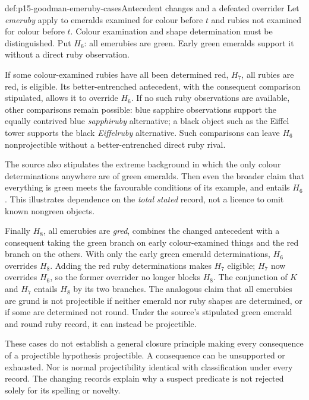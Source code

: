 \begin{hbexample}{def:p15-goodman-emeruby-cases}{Antecedent changes and a defeated overrider}
Let \emph{emeruby} apply to emeralds examined for colour before $t$ and
rubies not examined for colour before $t$. Colour examination and shape
determination must be distinguished. Put $H_6$: all emerubies are green.
Early green emeralds support it without a direct ruby observation.

If some colour-examined rubies have all been determined red, $H_7$, all
rubies are red, is eligible. Its better-entrenched antecedent, with the
consequent comparison stipulated, allows it to override $H_6$. If no
such ruby observations are available, other comparisons remain possible:
blue sapphire observations support the equally contrived blue
\emph{sapphiruby} alternative; a black object such as the Eiffel tower
supports the black \emph{Eiffelruby} alternative. Such comparisons can
leave $H_6$ nonprojectible without a better-entrenched direct ruby rival.

The source also stipulates the extreme background in which the only
colour determinations anywhere are of green emeralds. Then even the
broader claim that everything is green meets the favourable conditions
of its example, and entails $H_6$. This illustrates dependence on the
\emph{total stated} record, not a licence to omit known nongreen objects.

Finally $H_8$, all emerubies are \emph{gred}, combines the changed
antecedent with a consequent taking the green branch on early
colour-examined things and the red branch on the others. With only the
early green emerald determinations, $H_6$ overrides $H_8$. Adding the
red ruby determinations makes $H_7$ eligible; $H_7$ now overrides $H_6$,
so the former overrider no longer blocks $H_8$. The conjunction of $K$
and $H_7$ entails $H_8$ by its two branches. The analogous claim that all
emerubies are grund is not projectible if neither emerald nor ruby shapes
are determined, or if some are determined not round. Under the source's
stipulated green emerald and round ruby record, it can instead be projectible.
\parencite[IV.4, pp.~104--106]{Goodman1983FourthProjection}
\end{hbexample}

These cases do not establish a general closure principle making every
consequence of a projectible hypothesis projectible. A consequence can be
unsupported or exhausted. Nor is normal projectibility identical with
classification under every record. The changing records explain why a
suspect predicate is not rejected solely for its spelling or novelty.

